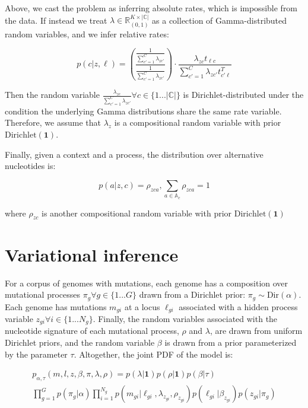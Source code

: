 \documentclass{article}
\begin{document}
Above, we cast the problem as inferring absolute rates, which is impossible from the data. If instead we treat $\lambda \in \mathbb{R}^{K \times |\mathbb{C}|}_{(0,1)}$ as a collection of Gamma-distributed random variables, and we infer relative rates:

\begin{equation}
p(c | z, \ell) = 
\left( \frac{\frac{1}{\sum_{c'=1}^{C} \lambda_{zc'}}}{\frac{1}{\sum_{c'=1}^{C} \lambda_{zc'}}} \right) \cdot \frac{\lambda_{zc}t_{\ell c}}{\sum_{c'=1}^{C} \lambda_{zc'}t^{T}_{c' \ell}} 
\end{equation}

Then the random variable $\frac{\lambda_{zc}}{\sum_{c'=1}^{C} \lambda_{zc'}} \forall c \in \{1 ... |\mathbb{C}|\}$ is Dirichlet-distributed under the condition the underlying Gamma distributions share the same rate variable. Therefore, we assume that $\lambda_z$ is a compositional random variable with prior $\mathrm{Dirichlet}(\mathbf{1})$.

Finally, given a context and a process, the distribution over alternative nucleotides is:

\begin{equation}
p(a | z, c) = \rho_{zca}, \sum_{a \in \mathbb{A}_c} \rho_{zca} = 1
\end{equation}

where $\rho_{zc}$ is another compositional random variable with prior $\mathrm{Dirichlet}(\mathbf{1})$

\section{Variational inference}

For a corpus of genomes with mutations, each genome has a composition over mutational processes $\pi_g\forall g \in \{1...G\}$ drawn from a Dirichlet prior: $\pi_g \sim \mathrm{Dir}(\alpha)$. Each genome has mutations $m_{gi}$ at a locus $\ell_{gi}$ associated with a hidden process variable $z_{gi} \forall i \in \{1...N_g\}$. Finally, the random variables associated with the nucleotide signature of each mutational process, $\rho$ and $\lambda$, are drawn from uniform Dirichlet priors, and the random variable $\beta$ is drawn from a prior parameterized by the parameter $\tau$. Altogether, the joint PDF of the model is:

\begin{align*}
p_{\alpha,\tau}(m,l,z,\beta,\pi,\lambda,\rho) = p(\lambda | \textbf{1})p(\rho | \textbf{1})p(\beta | \tau) \\
	 \prod_{g=1}^G p( \pi_g | \alpha ) \prod_{i=1}^{N_g} p(m_{gi} | \ell_{gi}, \lambda_{z_{gi}}, \rho_{z_{gi}} ) p( \ell_{gi} | \beta_{z_{gi}} ) p(z_{gi} | \pi_g )
\end{align*}
\end{document}
